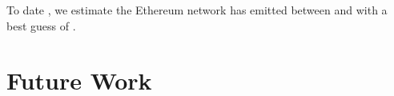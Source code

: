 To date {\todaterange}, we estimate the Ethereum network has emitted between  and  with a best guess of .






\section{Future Work}

